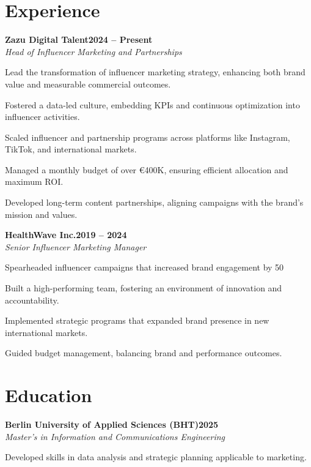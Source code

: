 \documentclass[letterpaper,10pt]{article}
\newcommand{\heading}[2]{
  \hspace{10pt}#1\hfill#2\\
}
\newcommand{\headingBf}[2]{
  \heading{\textbf{#1}}{\textbf{#2}}
}
\newcommand{\headingIt}[2]{
  \heading{\textit{#1}}{\textit{#2}}
}
\newenvironment{resume_list}{
  \vspace{-7pt}
  \begin{itemize}[itemsep=-2px, parsep=1pt, leftmargin=20pt, labelsep=10pt]
}{
  \end{itemize}
}
\begin{document}

\section{Experience}

\headingBf{Zazu Digital Talent}{2024 -- Present}
\headingIt{Head of Influencer Marketing and Partnerships}{}
\begin{resume_list}
  \item Lead the transformation of influencer marketing strategy, enhancing both brand value and measurable commercial outcomes.
  \item Fostered a data-led culture, embedding KPIs and continuous optimization into influencer activities.
  \item Scaled influencer and partnership programs across platforms like Instagram, TikTok, and international markets.
  \item Managed a monthly budget of over €400K, ensuring efficient allocation and maximum ROI.
  \item Developed long-term content partnerships, aligning campaigns with the brand’s mission and values.
\end{resume_list}

\vspace{-0.5em}
\headingBf{HealthWave Inc.}{2019 -- 2024}
\headingIt{Senior Influencer Marketing Manager}{}
\begin{resume_list}
  \item Spearheaded influencer campaigns that increased brand engagement by 50%
  \item Built a high-performing team, fostering an environment of innovation and accountability.
  \item Implemented strategic programs that expanded brand presence in new international markets.
  \item Guided budget management, balancing brand and performance outcomes.
\end{resume_list}

\newpage
\section{Education}

\headingBf{Berlin University of Applied Sciences (BHT)}{2025}
\headingIt{Master's in Information and Communications Engineering}{}
\begin{resume_list}
  \item Developed skills in data analysis and strategic planning applicable to marketing.
\end{resume_list}
\end{document}

